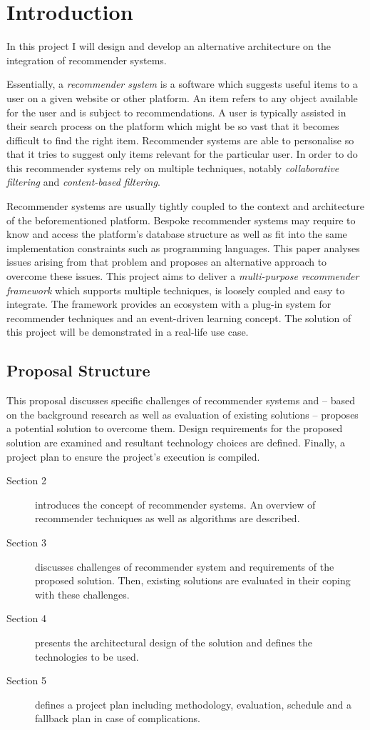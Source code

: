 \chapter{Introduction}

In this project I will design and develop an alternative architecture on the integration of recommender systems.

Essentially, a \emph{recommender system} is a software which suggests useful items to a user on a given website or other platform. An item refers to any object available for the user and is subject to recommendations. A user is typically assisted in their search process on the platform which might be so vast that it becomes difficult to find the right item. Recommender systems are able to personalise so that it tries to suggest only items relevant for the particular user. In order to do this recommender systems rely on multiple techniques, notably \emph{collaborative filtering} and \emph{content-based filtering}.

Recommender systems are usually tightly coupled to the context and architecture of the beforementioned platform. Bespoke recommender systems may require to know and access the platform's database structure as well as fit into the same implementation constraints such as programming languages. This paper analyses issues arising from that problem and proposes an alternative approach to overcome these issues. This project aims to deliver a \emph{multi-purpose recommender framework} which supports multiple techniques, is loosely coupled and easy to integrate. The framework provides an ecosystem with a plug-in system for recommender techniques and an event-driven learning concept. The solution of this project will be demonstrated in a real-life use case.

\section{Proposal Structure}

This proposal discusses specific challenges of recommender systems and -- based on the background research as well as evaluation of existing solutions -- proposes a potential solution to overcome them. Design requirements for the proposed solution are examined and resultant technology choices are defined. Finally, a project plan to ensure the project's execution is compiled.

\begin{description}
    \item[Section 2] introduces the concept of recommender systems. An overview of recommender techniques as well as algorithms are described.
    \item[Section 3] discusses challenges of recommender system and requirements of the proposed solution. Then, existing solutions are evaluated in their coping with these challenges.
    \item[Section 4] presents the architectural design of the solution and defines the technologies to be used.
    \item[Section 5] defines a project plan including methodology, evaluation, schedule and a fallback plan in case of complications.
\end{description}